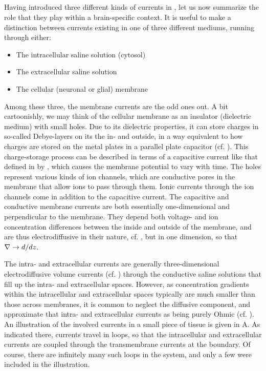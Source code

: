 \subsection{}
\label{Basics:braincurrents}
Having introduced three different kinds of currents in , let us now summarize the role that they play within a brain-specific context. It is useful to make a distinction between currents existing in one of three different mediums, running through either: 
\begin{itemize}
\item The intracellular saline solution (cytosol)
\item The extracellular saline solution
\item The cellular (neuronal or glial) membrane
\end{itemize}

Among these three, the membrane currents are the odd ones out. A bit cartoonishly, we may think of the cellular membrane as an insulator (dielectric medium) with small holes. Due to its dielectric properties, it can store charges in so-called Debye-layers on its the in- and outside, in a way equivalent to how charges are stored on the metal plates in a parallel plate capacitor (cf. ). This charge-storage process can be described in terms of a capacitive current like that defined in by , which causes the membrane potential to vary with time. The holes represent various kinds of ion channels, which are conductive pores in the membrane that allow ions to pass through them. Ionic currents through the ion channels come in addition to the capacitive current. The capacitive and conductive membrane currents are both essentially one-dimensional and perpendicular to the membrane. They depend both voltage- and ion concentration differences between the inside and outside of the membrane, and are thus electrodiffusive in their nature, cf. , but in one dimension, so that ${\bf \nabla} \rightarrow d/dz$. 

The intra- and extracellular currents are generally three-dimensional electrodiffusive volume currents (cf. ) through the conductive saline solutions that fill up the intra- and extracellular spaces. However, as concentration gradients within the intracellular and extracellular spaces typically are much smaller than those across membranes, it is common to neglect the diffusive component, and approximate that intra- and extracellular currents as being purely Ohmic (cf. ). An illustration of the involved currents in a small piece of tissue is given in A. As indicated there, currents travel in loops, so that the intracellular and extracellular currents are coupled through the transmembrane currents at the boundary. Of course, there are infinitely many such loops in the system, and only a few were included in the illustration. 

